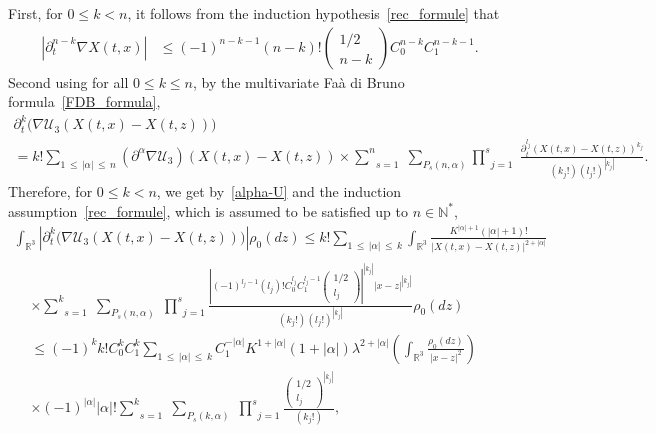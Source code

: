 \documentclass[AHL,Unicode,longabstracts,published]{cedram}
\newcommand{\R}{\mathbb{R}}
\newcommand{\N}{\mathbb{N}}
\newcommand{\clU}{\mathcal{U}}
\renewcommand{\leq}{\leqslant}
\begin{document}
First, for $0 \leq k<n$, it follows from the induction hypothesis~\eqref{rec_formule} that
\begin{align}\label{formule_reccurence_gradX}
\left| \partial_t^{n-k}\nabla X(t,x) \right|&\leq (-1)^{n-k-1}(n-k)!
\begin{pmatrix}
1/2 \\ n-k
\end{pmatrix} C_0^{n-k} C_1^{n-k-1}.
\end{align}
Second using for all $0 \leq k\leq n$, by the multivariate Faà di Bruno formula~\eqref{FDB_formula},
\begin{multline*}
\partial_t^k \big(\nabla \clU_3(X(t,x)-X(t,z))\big)\\
=k! \underset{1\,\leq\,|\alpha|\,\leq\,n}{\sum} \left(\partial^\alpha \nabla \clU_3 \right)(X(t,x)-X(t,z))
\times \underset{s=1}{\overset{n}{\sum}}\;\underset{P_s(n,\alpha)}{\sum}\underset{j=1}{\overset{s}{\prod}}\;\frac{\partial_t^{l_j} (X(t,x)-X(t,z))^{k_j}}{\left(k_j!\right) \left(l_j!\right)^{|k_j|}}.
\end{multline*}
Therefore, for $0 \leq k <n$, we get by~\eqref{alpha-U} and the induction assumption~\eqref{rec_formule}, which is assumed to be satisfied up to $n \in \N^*$,
\begin{multline*}
\int_{\R^3} \left|\partial_t^k \big(\nabla \clU_3(X(t,x)-X(t,z))\big) \right| \rho_0(dz) \leq k! \underset{1\,\leq\,|\alpha|\,\leq\,k}{\sum} \int_{\R^3} \frac{K^{|\alpha|+1}(|\alpha|+1)!}{|X(t,x)-X(t,z)|^{2+|\alpha|} }\\
\begin{aligned}
&\times \underset{s=1}{\overset{k}{\sum}}\;\underset{P_s(n,\alpha)}{\sum}\;\underset{j=1}{\overset{s}{\prod}}\frac{\left| (-1)^{l_j-1}(l_j)!C_0^{l_j}C_1^{l_j-1}
\begin{pmatrix}
1/2\\ l_j
\end{pmatrix}\right|^{\left|k_j\right|} |x-z|^{\left|k_j\right|}}{\left(k_j!\right) \left(l_j!\right)^{\left|k_j\right|}}\rho_0(dz)\\
& \leq (-1)^{k} k!C_0^kC_1^k\underset{1\,\leq\,|\alpha|\,\leq\,k}{\sum} C_1^{-|\alpha|}K^{1+|\alpha|}(1+|\alpha|)\lambda^{2+|\alpha|} \left(\int_{\R^3}\frac{\rho_0(dz)}{|x-z|^2} \right) \\
& \times (-1)^{|\alpha|}|\alpha|!\underset{s=1}{\overset{k}{\sum}}\;\underset{P_s(k,\alpha)}{\sum}\;\underset{j=1}{\overset{s}{\prod}}\frac{
\begin{pmatrix}1/2\\ l_j
\end{pmatrix}^{\left|k_j\right|}}{\left(k_j!\right)},
\end{aligned}
 \end{multline*}
\end{document}
